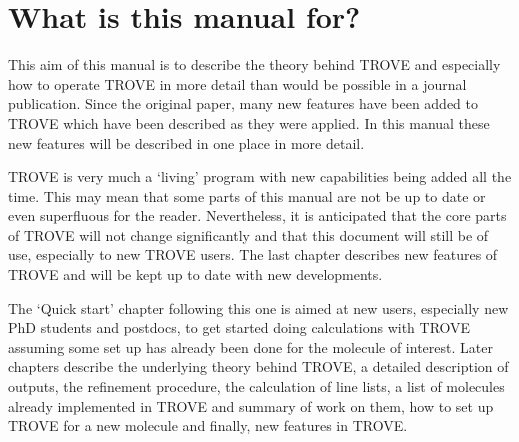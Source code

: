 \section{What is this manual for?}
This aim of this manual is to describe the theory behind TROVE and especially how to operate TROVE in more detail than
would be possible in a journal publication. Since the original paper, many new features have been added to TROVE which have
been described as they were applied. In this manual these new features will be described in one place in more detail.

TROVE is very much a `living' program with new capabilities being added all the time. This may mean that some parts of 
this manual are not be up to date or even superfluous for the reader. Nevertheless, it is anticipated that the core
parts of TROVE will not change significantly and that this document will still be of use, especially to new
TROVE users. The last chapter describes new features of TROVE and will be kept up to date with new developments. 


The `Quick start' chapter following this one is aimed at new users, especially new PhD students and postdocs, to get 
 started doing calculations with TROVE assuming some set up has already been done for the molecule of interest. 
Later chapters describe the underlying theory behind TROVE, a detailed description of outputs, the refinement procedure,
the calculation of line lists, a list of molecules already implemented in TROVE and summary of work on them, 
how to set up TROVE for a new molecule and finally, new features in TROVE. 







